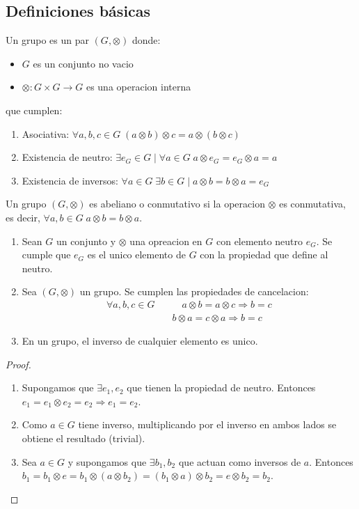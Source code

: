 \subsection{Definiciones básicas}
\begin{definition}[Grupo]
	Un grupo es un par \((G, \otimes )\) donde:
	\begin{itemize}
		\item \(G \) es un conjunto no vacio
		\item \(\otimes\colon G \times G \to G \) es una operacion interna
	\end{itemize}
	que cumplen:
	\begin{enumerate}
		\item Asociativa: \(\forall a,b,c \in G \; (a \otimes b) \otimes c = a \otimes (b \otimes c)\)
		\item Existencia de neutro: \(\exists e_G \in G \mid \forall a \in G \; a \otimes e_G = e_G \otimes a = a \)
		\item Existencia de inversos: \(\forall a \in G \; \exists b \in G \mid a \otimes b = b \otimes a = e_G \)
	\end{enumerate}
\end{definition}
\begin{definition}
	Un grupo \((G,\otimes )\) es abeliano o conmutativo si la operacion \(\otimes \) es conmutativa, es decir, \(\forall a,b \in G \; a \otimes b = b \otimes a \).
\end{definition}
\begin{proposition}
	\begin{enumerate}
		\item Sean \(G \) un conjunto y \(\otimes \) una opreacion en \(G \) con elemento neutro \(e_G \). Se cumple que \(e_G \) es el unico elemento de \(G \) con la propiedad que define al neutro.
		\item Sea \((G, \otimes )\) un grupo. Se cumplen las propiedades de cancelacion:
		      \[
			      \begin{aligned}
				      \forall a,b,c \in G \quad & \quad a \otimes b = a \otimes c \Rightarrow b = c \\
				                                & b \otimes a = c \otimes a \Rightarrow b = c
			      \end{aligned}
		      \]
		\item En un grupo, el inverso de cualquier elemento es unico.
	\end{enumerate}
\end{proposition}
\begin{proof}
	\begin{enumerate}
		\item Supongamos que \(\exists e_1,e_2 \) que tienen la propiedad de neutro. Entonces \(e_1 = e_1 \otimes e_2 = e_2 \Rightarrow e_1 = e_2 \).
		\item Como \(a \in G \) tiene inverso, multiplicando por el inverso en ambos lados se obtiene el resultado (trivial).
		\item Sea \(a \in G \) y supongamos que \(\exists b_1,b_2 \) que actuan como inversos de \(a \). Entonces \(b_1 = b_1 \otimes e = b_1 \otimes (a \otimes b_2) = (b_1 \otimes a) \otimes b_2 = e \otimes b_2 = b_2 \).
	\end{enumerate}
\end{proof}
